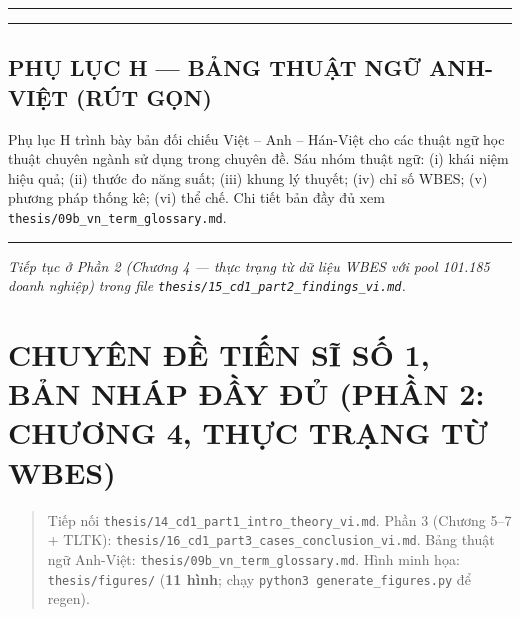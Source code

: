 \documentclass[12pt,a4paper]{article}
\begin{document}
\begin{center}\rule{0.5\linewidth}{0.5pt}\end{center}

\begin{center}\rule{0.5\linewidth}{0.5pt}\end{center}

\hypertarget{phux1ee5-lux1ee5c-h--bux1ea3ng-thuux1eadt-ngux1eef-anh-viux1ec7t-ruxfat-gux1ecdn}{%
\subsection{PHỤ LỤC H --- BẢNG THUẬT NGỮ ANH-VIỆT (RÚT
GỌN)}\label{phux1ee5-lux1ee5c-h--bux1ea3ng-thuux1eadt-ngux1eef-anh-viux1ec7t-ruxfat-gux1ecdn}}

Phụ lục H trình bày bản đối chiếu Việt -- Anh -- Hán-Việt cho các thuật
ngữ học thuật chuyên ngành sử dụng trong chuyên đề. Sáu nhóm thuật ngữ:
(i) khái niệm hiệu quả; (ii) thước đo năng suất; (iii) khung lý thuyết;
(iv) chỉ số WBES; (v) phương pháp thống kê; (vi) thể chế. Chi tiết bản
đầy đủ xem \texttt{thesis/09b\_vn\_term\_glossary.md}.

\begin{center}\rule{0.5\linewidth}{0.5pt}\end{center}

\emph{Tiếp tục ở Phần 2 (Chương 4 --- thực trạng từ dữ liệu WBES với
pool 101.185 doanh nghiệp) trong file
\texttt{thesis/15\_cd1\_part2\_findings\_vi.md}.}

\hypertarget{chuyuxean-ux111ux1ec1-tiux1ebfn-sux129-sux1ed1-1-bux1ea3n-nhuxe1p-ux111ux1ea7y-ux111ux1ee7-phux1ea7n-2-chux1b0ux1a1ng-4-thux1ef1c-trux1ea1ng-tux1eeb-wbes}{%
\section{CHUYÊN ĐỀ TIẾN SĨ SỐ 1, BẢN NHÁP ĐẦY ĐỦ (PHẦN 2: CHƯƠNG 4, THỰC
TRẠNG TỪ
WBES)}\label{chuyuxean-ux111ux1ec1-tiux1ebfn-sux129-sux1ed1-1-bux1ea3n-nhuxe1p-ux111ux1ea7y-ux111ux1ee7-phux1ea7n-2-chux1b0ux1a1ng-4-thux1ef1c-trux1ea1ng-tux1eeb-wbes}}

\begin{quote}
Tiếp nối \texttt{thesis/14\_cd1\_part1\_intro\_theory\_vi.md}. Phần 3
(Chương 5--7 + TLTK):
\texttt{thesis/16\_cd1\_part3\_cases\_conclusion\_vi.md}. Bảng thuật ngữ
Anh-Việt: \texttt{thesis/09b\_vn\_term\_glossary.md}. Hình minh họa:
\texttt{thesis/figures/} (\textbf{11 hình}; chạy
\texttt{python3\ generate\_figures.py} để regen).
\end{quote}
\end{document}
